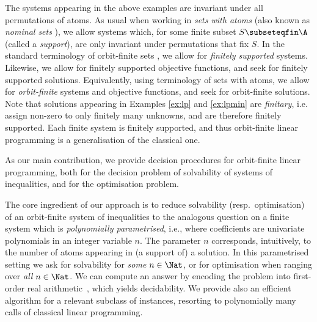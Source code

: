 The systems appearing in the above examples are invariant under all permutations of atoms.
As usual when working in \emph{sets with atoms} \cite{atombook} (also known as \emph{nominal sets} \cite{Pitts:book}),
we allow systems which, for some finite subset $S\subseteqfin \A$ (called a \emph{support}), 
are only invariant under permutations that fix $S$.
In the standard terminology of orbit-finite sets \cite{atombook}, we allow for \emph{finitely supported}
systems.
Likewise, 
we allow for finitely supported objective functions, and seek for finitely supported solutions. 
Equivalently, using terminology of sets with atoms,
we allow for \emph{orbit-finite} systems and objective functions, and seek for
orbit-finite solutions.
Note that solutions appearing in Examples \ref{ex:lp} and \ref{ex:lpmin} are \emph{finitary}, 
i.e. assign non-zero to only finitely
many unknowns, and are therefore finitely supported.
Each finite system is finitely supported, and thus orbit-finite linear programming is a generalisation
of the classical one.



As our main contribution, we provide decision procedures for orbit-finite linear programming, both for
the decision problem of solvability of systems of inequalities, and for the optimisation problem.

The core ingredient of our approach is to reduce solvability (resp.~optimisation) of an orbit-finite system of inequalities to the analogous question
on a finite system which is \emph{polynomially parametrised}, i.e., where coefficients are 
univariate polynomials in an integer variable $n$.
The parameter $n$ corresponds, intuitively, to the number of atoms appearing in (a support of) a solution.
In this parametrised setting we ask for solvability for \emph{some} $n\in\Nat$, or for optimisation
when ranging over \emph{all} $n\in\Nat$.
We can compute an answer by encoding the problem into first-order
real arithmetic~\cite{Tar51,ra-book}, %
which yields decidability.
We provide also an efficient \PTIME algorithm for a relevant subclass of instances, 
resorting to polynomially many calls of 
classical linear programming.

